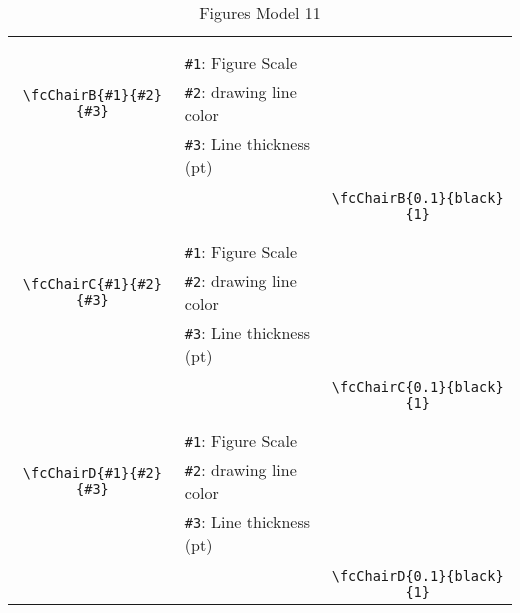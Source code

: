 \documentclass[x11names]{article}
\begin{document}
\begin{table}[H]
\begin{tabular}{|c|l|c|}
	&&\multirow{5}{*}{\fcChairB{0.1}{black}{1}}\\	&&\\	&\verb|#1|: Figure Scale &\\	\verb|\fcChairB{#1}{#2}{#3}|&	\verb|#2|: drawing line color &\\	&\verb|#3|: Line thickness (pt) &\\ &&\\&&	\verb|\fcChairB{0.1}{black}{1}|\\\hline 	
	&&\multirow{5}{*}{\fcChairC{0.1}{black}{1}}\\	&&\\	&\verb|#1|: Figure Scale &\\	\verb|\fcChairC{#1}{#2}{#3}|&	\verb|#2|: drawing line color &\\	&\verb|#3|: Line thickness (pt) &\\ &&\\&&	\verb|\fcChairC{0.1}{black}{1}|\\\hline 	
	&&\multirow{5}{*}{\fcChairD{0.1}{black}{1}}\\	&&\\	&\verb|#1|: Figure Scale &\\	\verb|\fcChairD{#1}{#2}{#3}|&	\verb|#2|: drawing line color &\\	&\verb|#3|: Line thickness (pt) &\\ &&\\&&	\verb|\fcChairD{0.1}{black}{1}|\\\hline 	\hline\end{tabular}\caption{Figures Model 11}\label{tab11}\end{table}
\end{document}
